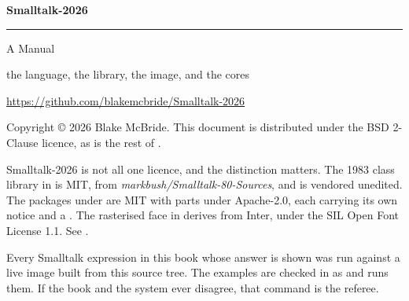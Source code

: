 \thispagestyle{empty}
\begin{center}
\vspace*{1.1in}
{\sffamily\fontsize{40}{44}\selectfont\bfseries\color{stblue} Smalltalk-2026}

\vspace{10pt}
{\color{strule}\rule{0.62\textwidth}{1pt}}

\vspace{14pt}
{\sffamily\Large\color{stink} A Manual}

\vspace{6pt}
{\sffamily\normalsize\color{stgrey} the language, the library, the image, and the cores}

\vfill

{\small\color{stgrey}
\url{https://github.com/blakemcbride/Smalltalk-2026}
}

\vspace{18pt}
\end{center}

\clearpage
\thispagestyle{empty}
\vspace*{\fill}
\noindent
\begin{minipage}{\textwidth}
\small\color{stgrey}
\noindent
Copyright \copyright{} 2026 Blake McBride. This document is distributed under
the BSD 2-Clause licence, as is the rest of .

\vspace{8pt}\noindent
Smalltalk-2026 is not all one licence, and the distinction matters. The 1983
class library in  is MIT, from \emph{markbush/Smalltalk-80-Sources},
and is vendored unedited. The packages under  are MIT with parts
under Apache-2.0, each carrying its own notice and a . The
rasterised face in  derives from Inter, under the SIL
Open Font License 1.1. See .

\vspace{8pt}\noindent
Every Smalltalk expression in this book whose answer is shown was run against
a live image built from this source tree. The examples are checked in as
 and  runs
them. If the book and the system ever disagree, that command is the referee.
\end{minipage}
\vspace*{\fill}
